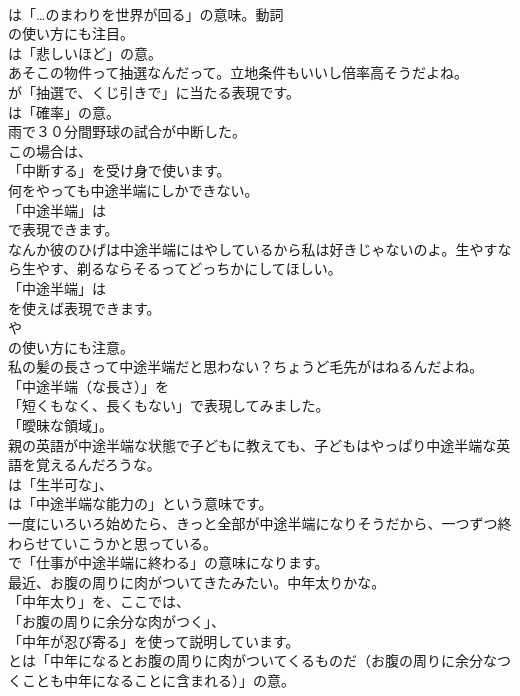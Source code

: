 \documentclass[8pt]{extreport}
\begin{document}
\begin{CJK}{UTF8}{min}
\\	は「…のまわりを世界が回る」の意味。動詞 
\\	の使い方にも注目。
\\	は「悲しいほど」の意。	
\\	あそこの物件って抽選なんだって。立地条件もいいし倍率高そうだよね。 
\\	が「抽選で、くじ引きで」に当たる表現です。
\\	は「確率」の意。	
\\	雨で３０分間野球の試合が中断した。 
\\	この場合は、
\\	「中断する」を受け身で使います。	
\\	何をやっても中途半端にしかできない。 
\\	「中途半端」は
\\	で表現できます。	
\\	なんか彼のひげは中途半端にはやしているから私は好きじゃないのよ。生やすなら生やす、剃るならそるってどっちかにしてほしい。 
\\	「中途半端」は
\\	を使えば表現できます。
\\	や
\\	の使い方にも注意。	
\\	私の髪の長さって中途半端だと思わない？ちょうど毛先がはねるんだよね。 
\\	「中途半端（な長さ）」を
\\	「短くもなく、長くもない」で表現してみました。
\\	「曖昧な領域」。	
\\	親の英語が中途半端な状態で子どもに教えても、子どもはやっぱり中途半端な英語を覚えるんだろうな。 
\\	は「生半可な」、
\\	は「中途半端な能力の」という意味です。	
\\	一度にいろいろ始めたら、きっと全部が中途半端になりそうだから、一つずつ終わらせていこうかと思っている。 
\\	で「仕事が中途半端に終わる」の意味になります。	
\\	最近、お腹の周りに肉がついてきたみたい。中年太りかな。 
\\	「中年太り」を、ここでは、
\\	「お腹の周りに余分な肉がつく」、
\\	「中年が忍び寄る」を使って説明しています。
\\	とは「中年になるとお腹の周りに肉がついてくるものだ（お腹の周りに余分なつくことも中年になることに含まれる）」の意。	

\end{CJK}
\end{document}
